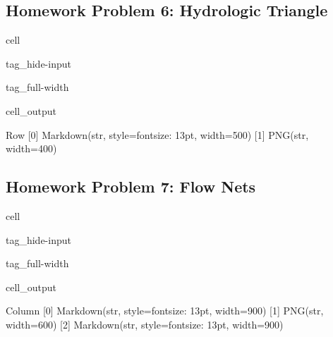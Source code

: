 \documentclass[letterpaper,10pt,english]{jupyterBook}
\begin{document}
\subsection{Homework Problem 6: Hydrologic Triangle}
\label{\detokenize{content/tutorials/T5/tutorial_05:homework-problem-6-hydrologic-triangle}}
\begin{sphinxuseclass}{cell}
\begin{sphinxuseclass}{tag_hide-input}
\begin{sphinxuseclass}{tag_full-width}\begin{sphinxVerbatimOutput}

\begin{sphinxuseclass}{cell_output}
\begin{sphinxVerbatim}[commandchars=\\\{\}]
Row
    [0] Markdown(str, style=\PYGZob{}\PYGZsq{}font\PYGZhy{}size\PYGZsq{}: \PYGZsq{}13pt\PYGZsq{}\PYGZcb{}, width=500)
    [1] PNG(str, width=400)
\end{sphinxVerbatim}

\end{sphinxuseclass}\end{sphinxVerbatimOutput}

\end{sphinxuseclass}
\end{sphinxuseclass}
\end{sphinxuseclass}

\subsection{Homework Problem 7: Flow Nets}
\label{\detokenize{content/tutorials/T5/tutorial_05:homework-problem-7-flow-nets}}
\begin{sphinxuseclass}{cell}
\begin{sphinxuseclass}{tag_hide-input}
\begin{sphinxuseclass}{tag_full-width}\begin{sphinxVerbatimOutput}

\begin{sphinxuseclass}{cell_output}
\begin{sphinxVerbatim}[commandchars=\\\{\}]
Column
    [0] Markdown(str, style=\PYGZob{}\PYGZsq{}font\PYGZhy{}size\PYGZsq{}: \PYGZsq{}13pt\PYGZsq{}\PYGZcb{}, width=900)
    [1] PNG(str, width=600)
    [2] Markdown(str, style=\PYGZob{}\PYGZsq{}font\PYGZhy{}size\PYGZsq{}: \PYGZsq{}13pt\PYGZsq{}\PYGZcb{}, width=900)
\end{sphinxVerbatim}

\end{sphinxuseclass}\end{sphinxVerbatimOutput}

\end{sphinxuseclass}
\end{sphinxuseclass}
\end{sphinxuseclass}
\sphinxstepscope
\end{document}
